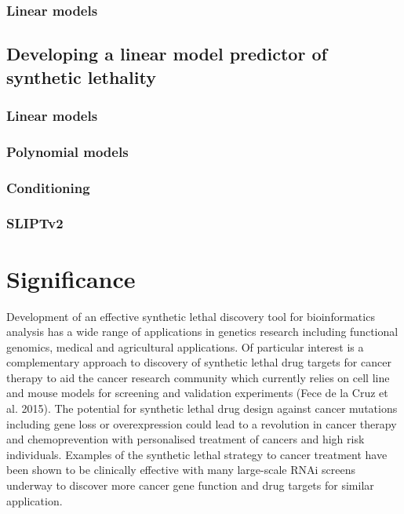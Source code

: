 \subsubsection{Linear models}

\subsection{Developing a linear model predictor of synthetic lethality}
\subsubsection{Linear models}
\subsubsection{Polynomial models}
\subsubsection{Conditioning}
\subsubsection{SLIPTv2}

\section{Significance}

Development of an effective synthetic lethal discovery tool for bioinformatics analysis has a wide range of applications in genetics research including functional genomics, medical and agricultural applications.   Of particular interest is a complementary approach to discovery of synthetic lethal drug targets for cancer therapy to aid the cancer research community which currently relies on cell line and mouse models for screening and validation experiments (Fece de la Cruz et al. 2015).  The potential for synthetic lethal drug design against cancer mutations including gene loss or overexpression could lead to a revolution in cancer therapy and chemoprevention with personalised treatment of cancers and high risk individuals.  Examples of the synthetic lethal strategy to cancer treatment have been shown to be clinically effective with many large-scale RNAi screens underway to discover more cancer gene function and drug targets for similar application.

